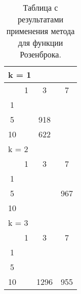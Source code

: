 \begin{table}
  \centering
  \begin{tabular}{|*4{c|}}
    \hline
    \multicolumn{4}{|l|}{k = 1} \\
    \hline
    \diagbox{$\mu$}{$\lambda$} & \multicolumn{1}{c|}{1} & \multicolumn{1}{c|}{3} & \multicolumn{1}{c|}{7} \\
    \hline
    1 & \cellcolor{olive}{3631} & \cellcolor{olive}{1776} & \cellcolor{olive}{1226} \\
    \hline
    5 & \cellcolor{olive}{1666} & 918& \cellcolor{olive}{502} \\
    \hline
    10 & \cellcolor{olive}{1008} & 622& \cellcolor{olive}{358} \\
    \hline
    \multicolumn{4}{|l|}{k = 2} \\
    \hline
    \diagbox{$\mu$}{$\lambda$} & \multicolumn{1}{c|}{1} & \multicolumn{1}{c|}{3} & \multicolumn{1}{c|}{7} \\
    \hline
    1 & \cellcolor{olive}{4744}& \cellcolor{olive}{1839}& \cellcolor{olive}{1160} \\
    \hline
    5 & \cellcolor{olive}{2467}& \cellcolor{olive}{1128} & 967 \\
    \hline
    10 & \cellcolor{olive}{1722}& \cellcolor{olive}{988}& \cellcolor{olive}{615} \\
    \hline
    \multicolumn{4}{|l|}{k = 3} \\
    \hline
    \diagbox{$\mu$}{$\lambda$} & \multicolumn{1}{c|}{1} & \multicolumn{1}{c|}{3} & \multicolumn{1}{c|}{7} \\
    \hline
    1 & \cellcolor{olive}{5159}& \cellcolor{olive}{2821} & \cellcolor{olive}{1517} \\
    \hline
    5 & \cellcolor{olive}{2704} & \cellcolor{olive}{1544} & \cellcolor{olive}{902} \\
    \hline
    10 & \cellcolor{olive}{2048} & 1296 & 955 \\
  \hline
  \end{tabular}
  \captionsetup{justification=centering}
  \caption{Таблица с результатами применения метода  для функции Розенброка.}
\end{table}


